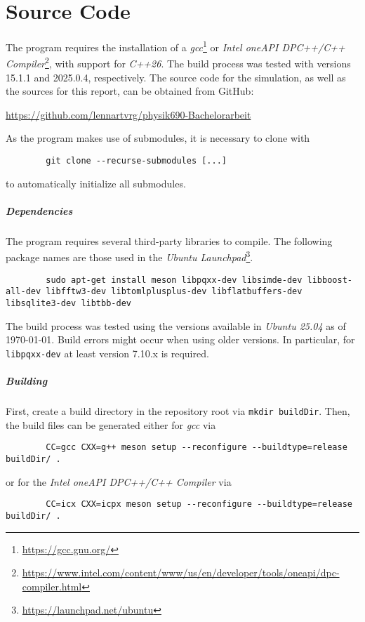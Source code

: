\chapter{Source Code}\label{chap:source_code}
	The program requires the installation of a \emph{gcc}\footnote{\url{https://gcc.gnu.org/}} or \emph{Intel\textsuperscript{\tiny\textregistered} oneAPI DPC++/C++ Compiler}\footnote{\url{https://www.intel.com/content/www/us/en/developer/tools/oneapi/dpc-compiler.html}}, with support for \emph{C++26}. The build process was tested with versions 15.1.1 and 2025.0.4, respectively. The source code for the simulation, as well as the sources for this report, can be obtained from GitHub:
	\begin{center}
		\url{https://github.com/lennartvrg/physik690-Bachelorarbeit}
	\end{center}
	As the program makes use of submodules, it is necessary to clone with 
	\begin{verbatim}
		git clone --recurse-submodules [...]
	\end{verbatim}
	to automatically initialize all submodules.
	
	\paragraph{Dependencies}
	The program requires several third-party libraries to compile. The following package names are those used in the \emph{Ubuntu Launchpad}\footnote{\url{https://launchpad.net/ubuntu}}.
	\begin{verbatim}
		sudo apt-get install meson libpqxx-dev libsimde-dev libboost-all-dev libfftw3-dev libtomlplusplus-dev libflatbuffers-dev libsqlite3-dev libtbb-dev
	\end{verbatim}
	The build process was tested using the versions available in \emph{Ubuntu 25.04} as of \today. Build errors might occur when using older versions. In particular, for \texttt{libpqxx-dev} at least version 7.10.x is required.
	
	\paragraph{Building}
	First, create a build directory in the repository root via \texttt{mkdir buildDir}. Then, the build files can be generated either for \emph{gcc} via
	\begin{verbatim}
		CC=gcc CXX=g++ meson setup --reconfigure --buildtype=release buildDir/ .
	\end{verbatim}
	or for the \emph{Intel\textsuperscript{\tiny\textregistered} oneAPI DPC++/C++ Compiler} via
	\begin{verbatim}
		CC=icx CXX=icpx meson setup --reconfigure --buildtype=release buildDir/ .
	\end{verbatim}